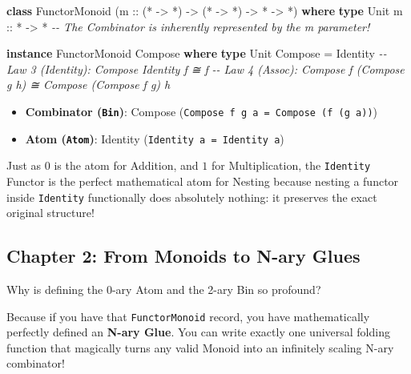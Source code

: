 \documentclass[
]{article}
\newenvironment{Shaded}{}{}
\newcommand{\CommentTok}[1]{\textcolor[rgb]{0.38,0.63,0.69}{\textit{#1}}}
\newcommand{\DataTypeTok}[1]{\textcolor[rgb]{0.56,0.13,0.00}{#1}}
\newcommand{\KeywordTok}[1]{\textcolor[rgb]{0.00,0.44,0.13}{\textbf{#1}}}
\newcommand{\NormalTok}[1]{#1}
\newcommand{\OperatorTok}[1]{\textcolor[rgb]{0.40,0.40,0.40}{#1}}
\newcommand{\OtherTok}[1]{\textcolor[rgb]{0.00,0.44,0.13}{#1}}
\providecommand{\tightlist}{%
  \setlength{\itemsep}{0pt}\setlength{\parskip}{0pt}}
\begin{document}
\begin{Shaded}
\begin{Highlighting}[]
\KeywordTok{class} \DataTypeTok{FunctorMonoid}\NormalTok{ (}\OtherTok{m ::}\NormalTok{ (}\OperatorTok{*} \OtherTok{{-}\textgreater{}} \OperatorTok{*}\NormalTok{) }\OtherTok{{-}\textgreater{}}\NormalTok{ (}\OperatorTok{*} \OtherTok{{-}\textgreater{}} \OperatorTok{*}\NormalTok{) }\OtherTok{{-}\textgreater{}} \OperatorTok{*} \OtherTok{{-}\textgreater{}} \OperatorTok{*}\NormalTok{) }\KeywordTok{where}
    \KeywordTok{type} \DataTypeTok{Unit}\OtherTok{ m ::} \OperatorTok{*} \OtherTok{{-}\textgreater{}} \OperatorTok{*}
    \CommentTok{{-}{-} The Combinator is inherently represented by the \textquotesingle{}m\textquotesingle{} parameter!}

\KeywordTok{instance} \DataTypeTok{FunctorMonoid} \DataTypeTok{Compose} \KeywordTok{where}
    \KeywordTok{type} \DataTypeTok{Unit} \DataTypeTok{Compose} \OtherTok{=} \DataTypeTok{Identity}
    \CommentTok{{-}{-} Law 3 (Identity): Compose Identity f  ≅ f}
    \CommentTok{{-}{-} Law 4 (Assoc):    Compose f (Compose g h) ≅ Compose (Compose f g) h}
\end{Highlighting}
\end{Shaded}

\begin{itemize}
\tightlist
\item
  \textbf{Combinator (\texttt{Bin})}: Compose
  (\texttt{Compose\ f\ g\ a\ =\ Compose\ (f\ (g\ a))})
\item
  \textbf{Atom (\texttt{Atom})}: Identity
  (\texttt{Identity\ a\ =\ Identity\ a})
\end{itemize}

Just as \(0\) is the atom for Addition, and \(1\) for Multiplication,
the \texttt{Identity} Functor is the perfect mathematical atom for
Nesting because nesting a functor inside \texttt{Identity} functionally
does absolutely nothing: it preserves the exact original structure!

\subsection{Chapter 2: From Monoids to N-ary
Glues}\label{chapter-2-from-monoids-to-n-ary-glues}

Why is defining the 0-ary Atom and the 2-ary Bin so profound?

Because if you have that \texttt{FunctorMonoid} record, you have
mathematically perfectly defined an \textbf{N-ary Glue}. You can write
exactly one universal folding function that magically turns any valid
Monoid into an infinitely scaling N-ary combinator!
\end{document}
